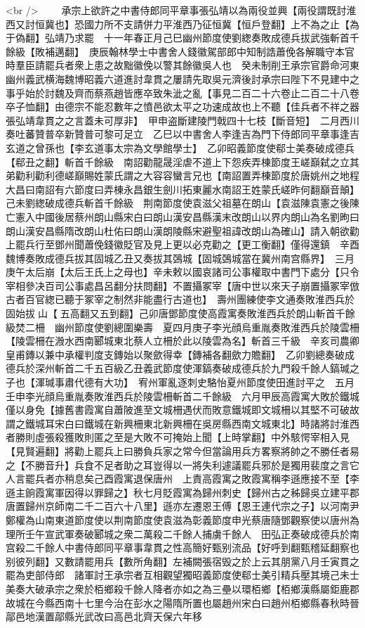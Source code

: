 <br />
　　承宗上欲許之中書侍郎同平章事張弘靖以為兩役並興【兩役謂既討淮西又討恒冀也】恐國力所不支請併力平淮西乃征恒冀【恒戶登翻】上不為之止【為于偽翻】弘靖乃求罷　十一年春正月己巳幽州節度使劉緫奏敗成德兵拔武強斬首千餘級【敗補邁翻】　庚辰翰林學士中書舍人錢徽駕部郎中知制誥蕭俛各解職守本官時羣臣請罷兵者衆上患之故黜徽俛以警其餘徽吳人也　癸未制削王承宗官爵命河東幽州義武横海魏博昭義六道進討韋貫之屢請先取吳元濟後討承宗曰陛下不見建中之事乎始於討魏及齊而蔡燕趙皆應卒致朱泚之亂【事見二百二十六卷止二百二十八卷卒子恤翻】由德宗不能忍數年之憤邑欲太平之功速成故也上不聽【佳兵者不祥之器張弘靖韋貫之之言蓋未可厚非】　甲申盗斷建陵門戟四十七枝【斷音短】　二月西川奏吐蕃贊普卒新贊普可黎可足立　乙巳以中書舍人李逢吉為門下侍郎同平章事逢吉玄道之曾孫也【李玄道事太宗為文學館學士】　乙卯昭義節度使郗士美奏破成德兵【郗丑之翻】斬首千餘級　南詔勸龍晟淫虐不道上下怨疾弄棟節度王嵯巔弑之立其弟勸利勸利德嵯巔賜姓蒙氏謂之大容容蠻言兄也【南詔置弄棟節度於唐姚州之地程大昌曰南詔有六節度曰弄棟永昌銀生劍川拓東麗水南詔王姓蒙氏嵯昨何翻巔音顛】　己未劉緫破成德兵斬首千餘級　荆南節度使袁滋父祖墓在朗山【袁滋陳袁憲之後陳亡憲入中國後居蔡州朗山縣宋白曰朗山漢安昌縣漢末改朗山以界内朗山為名劉昫曰朗山漢安昌縣隋改朗山杜佑曰朗山漢朗陵縣宋避聖祖諱改朗山為確山】請入朝欲勸上罷兵行至鄧州聞蕭俛錢徽貶官及見上更以必克勸之【更工衡翻】僅得還鎮　辛酉魏博奏敗成德兵拔其固城乙丑又奏拔其鵶城【固城鵶城當在冀州南宫縣界】　三月庚午太后崩【太后王氏上之母也】辛未敕以國哀諸司公事權取中書門下處分【只令宰相參决百司公事處昌呂翻分扶問翻】不置攝冢宰【唐中世以來天子崩置攝冢宰倣古者百官緫已聽于冢宰之制然非能盡行古道也】　壽州團練使李文通奏敗淮西兵於固始拔山【五高翻又五到翻】己卯唐鄧節度使高霞寓奏敗淮西兵於朗山斬首千餘級焚二柵　幽州節度使劉總圍樂壽　夏四月庚子李光顔烏重胤奏敗淮西兵於陵雲柵【陵雲柵在溵水西南郾城東北蔡人立柵於此以陵雲為名】斬首三千級　辛亥司農卿皇甫鏄以兼中承權判度支鏄始以聚歛得幸【鏄補各翻歛力贍翻】　乙卯劉總奏破成德兵於深州斬首二千五百級乙丑義武節度使渾鎬奏破成德兵於九門殺千餘人鎬瑊之子也【渾瑊事肅代德有大功】　宥州軍亂逐刺史駱怡夏州節度使田進討平之　五月壬申李光顔烏重胤奏敗淮西兵於陵雲柵斬首二千餘級　六月甲辰高霞寓大敗於鐵城僅以身免【據舊書霞寓自蕭陂進至文城柵遇伏而敗意鐵城即文城柵以其堅不可破故謂之鐵城耳宋白曰鐵城在新興柵東北新興柵在吳房縣西南文城東北】時諸將討淮西者勝則虛張殺獲敗則匿之至是大敗不可掩始上聞【上時掌翻】中外駭愕宰相入見【見賢遍翻】將勸上罷兵上曰勝負兵家之常今但當論用兵方畧察將帥之不勝任者易之【不勝音升】兵食不足者助之耳豈得以一將失利遽議罷兵邪於是獨用裴度之言它人言罷兵者亦稍息矣己酉霞寓退保唐州　上責高霞寓之敗霞寓稱李遜應接不至【李遜主餉霞寓軍因得以罪歸之】秋七月貶霞寓為歸州刺史【歸州古之秭歸吳立建平郡唐置歸州京師南二千二百六十八里】遜亦左遷恩王傅【恩王連代宗之子】以河南尹鄭權為山南東道節度使以荆南節度使袁滋為彰義節度申光蔡唐隨鄧觀察使以唐州為理所壬午宣武軍奏破郾城之衆二萬殺二千餘人捕虜千餘人　田弘正奏破成德兵於南宫殺二千餘人中書侍郎同平章事韋貫之性高簡好甄别流品【好呼到翻甄稽延翻察也别彼列翻】又數請罷用兵【數所角翻】左補闕張宿毁之於上云其朋黨八月壬寅貫之罷為吏部侍郎　諸軍討王承宗者互相觀望獨昭義節度使郗士美引精兵壓其境己未士美奏大破承宗之衆於栢鄉殺千餘人降者亦如之為三壘以環栢鄉【栢鄉漢縣屬鉅鹿郡故城在今縣西南十七里今治在彭水之陽隋所置也屬趙州宋白曰趙州栢鄉縣春秋時晉鄗邑地漢置鄗縣光武改曰高邑北齊天保六年移